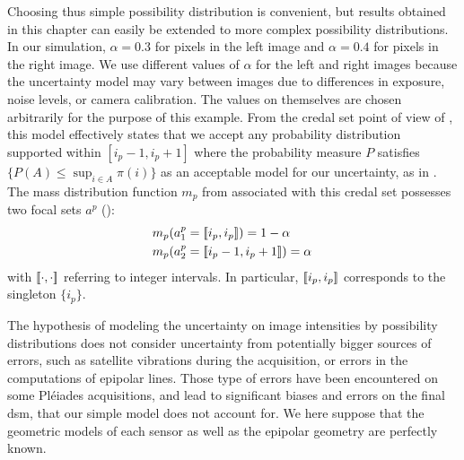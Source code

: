 Choosing thus simple possibility distribution is convenient, but results obtained in this chapter can easily be extended to more complex possibility distributions. In our simulation, $\alpha = 0.3$ for pixels in the left image and $\alpha = 0.4$ for pixels in the right image. We use different values of $\alpha$ for the left and right images because the uncertainty model may vary between images due to differences in exposure, noise levels, or camera calibration. The values on themselves are chosen arbitrarily for the purpose of this example. From the credal set point of view of , this model effectively states that we accept any probability distribution supported within $[i_p - 1, i_p + 1]$ where the probability measure $P$ satisfies $\{P(A) \leq \sup_{i \in A} \pi(i)\}$ as an acceptable model for our uncertainty, as in . The mass distribution function $m_p$ from  associated with this credal set possesses two focal sets $a^p$ ():
\begin{eqnarray}
    &m_p(a^p_1=[\![ i_p, i_p]\!])=1-\alpha\,\nonumber\\
    &m_p(a^p_2=[\![ i_p-1, i_p + 1]\!])=\alpha\,\label{eq:pixel_mass}
\end{eqnarray}
with $[\![\cdot, \cdot]\!]$ referring to integer intervals. In particular, $[\![ i_p, i_p]\!]$ corresponds to the singleton $\{i_p\}$.

\begin{remark}
    The hypothesis of modeling the uncertainty on image intensities by possibility distributions does not consider uncertainty from potentially bigger sources of errors, such as satellite vibrations during the acquisition, or errors in the computations of epipolar lines. Those type of errors have been encountered on some Pléiades acquisitions, and lead to significant biases and errors on the final \acrshort{dsm}, that our simple model does not account for. We here suppose that the geometric models of each sensor as well as the epipolar geometry are perfectly known.  
\end{remark}

